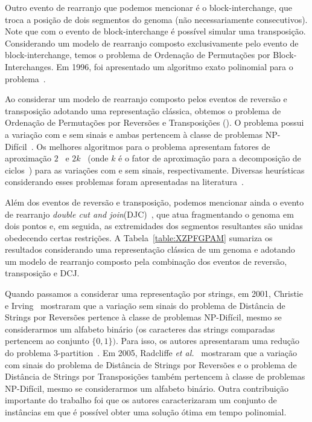 Outro evento de rearranjo que podemos mencionar é o block-interchange, que troca a posição de dois segmentos do genoma (não necessariamente consecutivos). Note que com o evento de block-interchange é possível simular uma transposição. Considerando um modelo de rearranjo composto exclusivamente pelo evento de block-interchange, temos o problema de Ordenação de Permutações por Block-Interchanges. Em 1996, foi apresentado um algoritmo exato polinomial para o problema~\cite{1996-christie}.

Ao considerar um modelo de rearranjo composto pelos eventos de reversão e transposição adotando uma representação clássica, obtemos o problema de Ordenação de Permutações por Reversões e Transposições (\SbRT). O problema possui a variação com e sem sinais e ambas pertencem à classe de problemas NP-Difícil~\cite{2019b-oliveira-etal}. Os melhores algoritmos para o problema apresentam fatores de aproximação $2$~\cite{1998-walter-etal} e $2k$~\cite{2008-rahman-etal} (onde $k$ é o fator de aproximação para a decomposição de ciclos~\cite{2013-chen}) para as variações com e sem sinais, respectivamente. Diversas heurísticas considerando esses problemas foram apresentadas na literatura~\cite{2014a-dias-etal,2018-brito-etal}.

Além dos eventos de reversão e transposição, podemos mencionar ainda o evento de rearranjo \emph{double cut and join}(DJC)~\cite{2005-yancopoulos-etal}, que atua fragmentando o genoma em dois pontos e, em seguida, as extremidades dos segmentos resultantes são unidas obedecendo certas restrições. A Tabela~\ref{table:XZPFGPAM} sumariza os resultados considerando uma representação clássica de um genoma e adotando um modelo de rearranjo composto pela combinação dos eventos de reversão, transposição e DCJ. 



Quando passamos a considerar uma representação por strings, em 2001, Christie e Irving~\cite{2001-christie-irving} mostraram que a variação sem sinais do problema de Distância de Strings por Reversões pertence à classe de problemas NP-Difícil, mesmo se considerarmos um alfabeto binário (os caracteres das strings comparadas pertencem ao conjunto $\{0,1\})$. Para isso, os autores apresentaram uma redução do problema 3-partition~\cite{1990-garey-johnson}. Em 2005, Radcliffe \textit{et al.}~\cite{2005-radcliffe-etal} mostraram que a variação com sinais do problema de Distância de Strings por Reversões e o problema de Distância de Strings por Transposições também pertencem à classe de problemas NP-Difícil, mesmo se considerarmos um alfabeto binário. Outra contribuição importante do trabalho foi que os autores caracterizaram um conjunto de instâncias em que é possível obter uma solução ótima em tempo polinomial.

